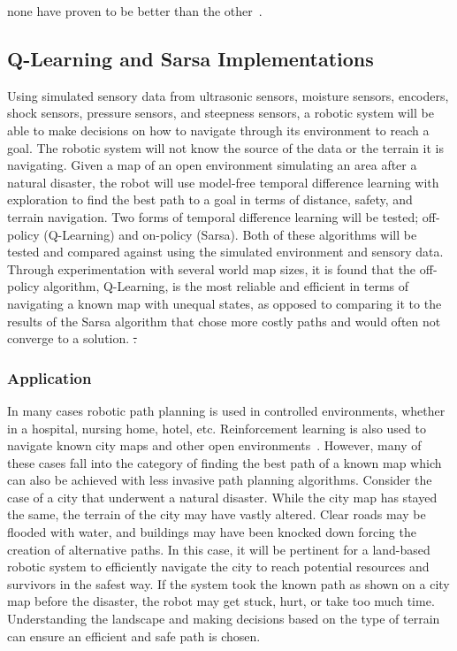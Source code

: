 \documentclass[12pt,american]{report}
\providecommand{\DIFaddtex}[1]{{\protect\color{blue}\uwave{#1}}} %
\providecommand{\DIFdeltex}[1]{{\protect\color{red}\sout{#1}}}                      %
\providecommand{\DIFaddbegin}{} %
\providecommand{\DIFaddend}{} %
\providecommand{\DIFdelbegin}{} %
\providecommand{\DIFdelend}{} %
\providecommand{\DIFadd}[1]{\texorpdfstring{\DIFaddtex{#1}}{#1}} %
\providecommand{\DIFdel}[1]{\texorpdfstring{\DIFdeltex{#1}}{}} %
\newcommand{\DIFscaledelfig}{0.5}
\newlength{\DIFdelgraphicswidth} %
\newlength{\DIFdelgraphicsheight} %
\newcommand{\DIFaddincludegraphics}[2][]{{\color{blue}\fbox{\DIFOincludegraphics[#1]{#2}}}} %
\newcommand{\DIFdelincludegraphics}[2][]{%
\sbox{\DIFdelgraphicsbox}{\DIFOincludegraphics[#1]{#2}}%
\settoboxwidth{\DIFdelgraphicswidth}{\DIFdelgraphicsbox} %
\settoboxtotalheight{\DIFdelgraphicsheight}{\DIFdelgraphicsbox} %
\scalebox{\DIFscaledelfig}{%
\parbox[b]{\DIFdelgraphicswidth}{\usebox{\DIFdelgraphicsbox}\\[-\baselineskip] \rule{\DIFdelgraphicswidth}{0em}}\llap{\resizebox{\DIFdelgraphicswidth}{\DIFdelgraphicsheight}{%
\setlength{\unitlength}{\DIFdelgraphicswidth}%
\begin{picture}(1,1)%
\thicklines\linethickness{2pt} %
{\color[rgb]{1,0,0}\put(0,0){\framebox(1,1){}}}%
{\color[rgb]{1,0,0}\put(0,0){\line( 1,1){1}}}%
{\color[rgb]{1,0,0}\put(0,1){\line(1,-1){1}}}%
\end{picture}%
}\hspace*{3pt}}} %
} %
\DeclareRobustCommand{\DIFaddbegin}{\DIFOaddbegin \let\includegraphics\DIFaddincludegraphics} %
\DeclareRobustCommand{\DIFaddend}{\DIFOaddend \let\includegraphics\DIFOincludegraphics} %
\DeclareRobustCommand{\DIFdelbegin}{\DIFOdelbegin \let\includegraphics\DIFdelincludegraphics} %
\DeclareRobustCommand{\DIFdelend}{\DIFOaddend \let\includegraphics\DIFOincludegraphics} %
\begin{document}
none have proven to be better than the other~\cite{Eden}.


\subsection{Q-Learning and Sarsa Implementations}
Using simulated sensory data from ultrasonic sensors, moisture sensors, encoders, shock sensors, pressure sensors, and steepness sensors, a robotic system will be able to make decisions on how to navigate through its environment to reach a goal.  The robotic system will not know the source of the data or the terrain it is navigating.  Given a map of an open environment simulating an area after a natural disaster, the robot will use model-free temporal difference learning with exploration to find the best path to a goal in terms of distance, safety, and terrain navigation. Two forms of temporal difference learning will be tested; off-policy (Q-Learning) and on-policy (Sarsa). Both of these algorithms will be tested and compared against using the simulated environment and sensory data. Through experimentation with several world map sizes, it is found that the off-policy algorithm, Q-Learning, is the most reliable and efficient in terms of navigating a known map with unequal states, as opposed to comparing it to the results of the Sarsa algorithm that chose more costly paths and would often not converge to a solution.
\DIFdelbegin \DIFdel{.
}\DIFdelend 

\subsubsection{Application}
In many cases robotic path planning is used in controlled environments, whether in a hospital, nursing home, hotel, etc. Reinforcement learning is also used to navigate known city maps and other open environments~\cite{peng2015mobile}. However, many of these cases fall into the category of finding the best path of a known map which can also be achieved with less invasive path planning algorithms. Consider the case of a city that underwent a natural disaster.  While the city map has stayed the same, the terrain of the city may have \DIFaddbegin \DIFadd{been }\DIFaddend vastly altered. Clear roads may be flooded with water, and buildings may have been knocked down forcing the creation of alternative paths. In this case, it will be pertinent for a land-based robotic system to efficiently navigate the city to reach potential resources and survivors in the safest way.  If the system took the known path as shown on a city map before the disaster, the robot may get stuck, hurt, or take too much time.  Understanding the landscape and making decisions based on the type of terrain can ensure an efficient and safe path is chosen.
\end{document}
